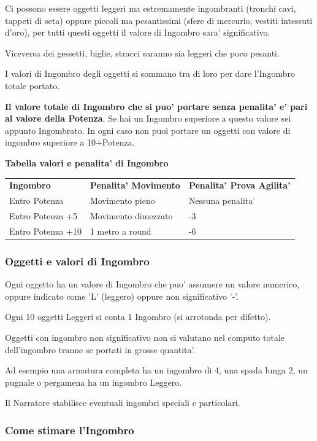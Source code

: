 \documentclass[a4paper,11pt,twoside,openany]{book}
\begin{document}
{Ci possono essere oggetti leggeri ma estremamente ingombranti (tronchi cavi, tappeti di seta) oppure piccoli ma pesantissimi (sfere di mercurio, vestiti intessuti d'oro), per tutti questi oggetti il valore di Ingombro sara' significativo.


Viceversa dei gessetti, biglie, stracci saranno sia leggeri che poco pesanti.

I valori di Ingombro degli oggetti si sommano tra di loro per dare l'Ingombro totale portato.

\textbf{Il valore totale di Ingombro che si puo' portare senza penalita' e' pari al valore della Potenza}.
Se hai un Ingombro superiore a questo valore sei appunto Ingombrato. In ogni caso non puoi portare un oggetti con valore di ingombro superiore a 10+Potenza.

\bigskip

\textbf{Tabella valori e penalita' di Ingombro}

\medskip

\begin{tabular}{lll}
	\hline
	\textbf{Ingombro} & \textbf{ Penalita' Movimento}&  \textbf{Penalita' Prova Agilita'}\\
	Entro Potenza&  Movimento pieno& Nessuna penalita' \\
	Entro Potenza +5&  Movimento dimezzato & -3 \\
	Entro Potenza +10&  1 metro a round & -6 \\
\end{tabular}

\subsubsection{Oggetti e valori di Ingombro}

Ogni oggetto ha un valore di Ingombro che puo' assumere un valore numerico, oppure indicato come 'L' (leggero) oppure non significativo '-'.

Ogni 10 oggetti Leggeri si conta 1 Ingombro (si arrotonda per difetto).


Oggetti con ingombro non significativo non si valutano nel computo totale dell'ingombro tranne se portati in grosse quantita'. 

Ad esempio una armatura completa ha un ingombro di 4, una spada lunga 2, un pugnale o pergamena ha un ingombro Leggero.

Il Narratore stabilisce eventuali ingombri speciali e particolari.

\subsubsection{Come stimare l'Ingombro}

}
\end{document}

